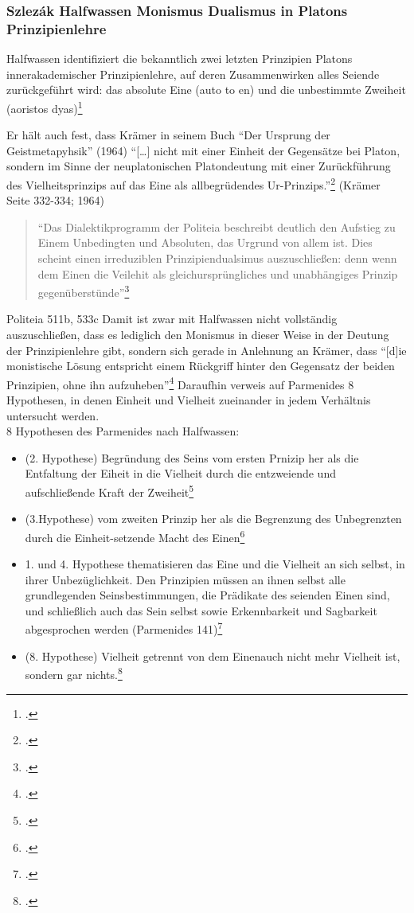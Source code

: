 \documentclass[12pt]{article}
\newcommand*{\zitatblock}[1]{%
    \begin{quote}
    \fontsize{10}{12}\selectfont
    \setlength{\parskip}{1.0em}
    #1
    \end{quote}
}
\begin{document}
\subsubsection*{Szlezák Halfwassen Monismus Dualismus in Platons Prinzipienlehre}

Halfwassen identifiziert die bekanntlich zwei letzten Prinzipien Platons innerakademischer Prinzipienlehre, auf deren Zusammenwirken alles Seiende zurückgeführt wird: das absolute Eine (auto to en) und die unbestimmte Zweiheit (aoristos dyas)\footcite[vgl.][S. 67]{HalfwassenMonismusDualismus}

Er hält auch fest, dass Krämer in seinem Buch \enquote{Der Ursprung der Geistmetapyhsik} (1964) \enquote{[\dots] nicht mit einer Einheit der Gegensätze bei Platon, sondern im Sinne der neuplatonischen Platondeutung mit einer Zurückführung des Vielheitsprinzips auf das Eine als allbegrüdendes Ur-Prinzips.}\footcite[][S. 68]{HalfwassenMonismusDualismus} (Krämer Seite 332-334; 1964) 
\zitatblock{\enquote{Das Dialektikprogramm der Politeia beschreibt deutlich den Aufstieg zu Einem Unbedingten und Absoluten, das Urgrund von allem ist. Dies scheint einen irreduziblen Prinzipiendualsimus auszuschließen: denn wenn dem Einen die Veilehit als gleichursprüngliches und unabhängiges Prinzip gegenüberstünde}\footcite[][S. 70f.]{HalfwassenMonismusDualismus}} Politeia 511b, 533c
Damit ist zwar mit Halfwassen nicht vollständig auszuschließen, dass es lediglich den Monismus in dieser Weise in der Deutung der Prinzipienlehre gibt, sondern sich gerade in Anlehnung an Krämer, dass \enquote{[d]ie monistische Lösung entspricht einem Rückgriff hinter den Gegensatz der beiden Prinzipien, ohne ihn aufzuheben}\footcite[vgl.][S. 333]{Krämer1964Geistmetaphysik}
Daraufhin verweis auf Parmenides 8 Hypothesen, in denen Einheit und Vielheit zueinander in jedem Verhältnis untersucht werden.\\
8 Hypothesen des Parmenides nach Halfwassen:
\begin{itemize}
    \item {(2. Hypothese) Begründung des Seins vom ersten Prnizip her als die Entfaltung der Eiheit in die Vielheit durch die entzweiende und aufschließende Kraft der Zweiheit}\footcite[vgl.][S. 72]{HalfwassenMonismusDualismus}
    \item {(3.Hypothese) vom zweiten Prinzip her als die Begrenzung des Unbegrenzten durch die Einheit-setzende Macht des Einen}\footcite[vgl.][S. 72]{HalfwassenMonismusDualismus}
    \item {1. und 4. Hypothese thematisieren das Eine und die Vielheit an sich selbst, in ihrer Unbezüglichkeit. Den Prinzipien müssen an ihnen selbst alle grundlegenden Seinsbestimmungen, die Prädikate des seienden Einen sind, und schließlich auch das Sein selbst sowie Erkennbarkeit und Sagbarkeit abgesprochen werden (Parmenides 141)}\footcite[vgl.][S. 72]{HalfwassenMonismusDualismus}
    \item {(8. Hypothese) Vielheit getrennt von dem Einenauch nicht mehr Vielheit ist, sondern gar nichts.\footcite[vgl.][S. 73]{HalfwassenMonismusDualismus}}
\end{itemize}
\end{document}
